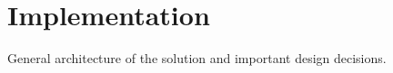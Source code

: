 \chapter{Implementation}
\thispagestyle{fancy}
\label{c:implementation}

General architecture of the solution and important design decisions.
